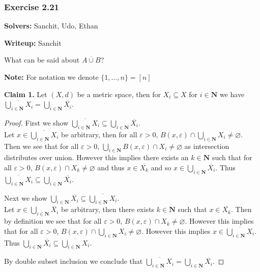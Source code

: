 \documentclass{article}
\newcommand{\N}{\mathbf{N}}
\theoremstyle{plain} %
\numberwithin{thm}{section} %
\theoremstyle{definition}
\begin{document}
    \subsubsection{Exercise 2.21}

    \noindent\textbf{Solvers:} Sanchit, Udo, Ethan

    \noindent\textbf{Writeup:} Sanchit

    What can be said about $\overline{A \cup B}$?

    \noindent \textbf{Note:} For notation we denote $\{1,\ldots,n\} = [n]$

    \textbf{Claim 1.} Let $(X,d)$ be a metric space, then for $X_i \subseteq X$ for $i \in \N$ we have $\overline{\bigcup\limits_{i \in \N} X_i} = \bigcup\limits_{i \in \N} \overline{X_i}$.

    \begin{proof}
        First we show $\overline{\bigcup\limits_{i \in \N} X_i} \subseteq \bigcup\limits_{i \in \N} \overline{X_i}$.\\
        Let $x \in \overline{\bigcup\limits_{i \in \N} X_i}$ be arbitrary, then for all $\varepsilon > 0$, $B(x,\varepsilon) \cap \bigcup\limits_{i \in \N} X_i \neq \varnothing$. Then we see that for all $\varepsilon > 0$, $\bigcup\limits_{i \in \N} B(x,\varepsilon) \cap X_i \neq \varnothing$ as intersection distributes over union. However this implies there exists an $k \in \N$ such that for all $\varepsilon > 0$, $B(x,\varepsilon) \cap X_k \neq \varnothing$ and thus $x \in \overline{X_k}$ and so $x \in \bigcup\limits_{i \in \N} \overline{X_i}$. Thus $\overline{\bigcup\limits_{i \in \N} X_i} \subseteq \bigcup\limits_{i \in \N} \overline{X_i}$.

        \bigskip

        \noindent Next we show $\bigcup\limits_{i \in \N} \overline{X_i} \subseteq \overline{\bigcup\limits_{i \in \N} X_i}$.\\
        Let $x \in \bigcup\limits_{i \in \N} \overline{X_i}$ be arbitrary, then there exists $k \in \N$ such that $x \in \overline{X_k}$. Then by definition we see that for all $\varepsilon > 0$, $B(x,\varepsilon) \cap X_k \neq \varnothing$. However this implies that for all $\varepsilon > 0$, $B(x,\varepsilon) \cap \bigcup\limits_{i \in \N} X_i \neq \varnothing$. However this implies $x \in \overline{\bigcup\limits_{i \in \N} X_i}$. Thus $\bigcup\limits_{i \in \N} \overline{X_i} \subseteq \overline{\bigcup\limits_{i \in \N} X_i}$.

        \bigskip

        \noindent By double subset inclusion we conclude that $\overline{\bigcup\limits_{i \in \N} X_i} = \bigcup\limits_{i \in \N} \overline{X_i}$.
    \end{proof}
\end{document}
